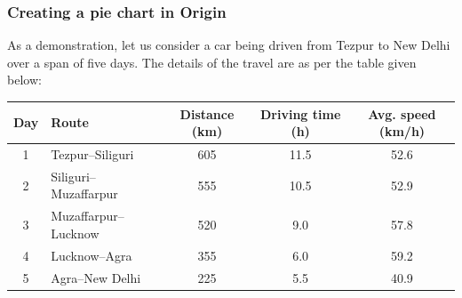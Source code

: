 		\subsubsection{Creating a pie chart in Origin}
			As a demonstration, let us consider a car being driven from Tezpur to New Delhi over a span of five days. The details of the travel are as per the table given below:\vspace{-1.5ex}
			\begin{table}[h!]
				\centering
				\begin{tabular}{c l S[table-format=4.0] S[table-format=2.1] S[table-format=2.1]} %
					\toprule[1.5pt]
					\textbf{Day} & \textbf{Route} & \textbf{Distance (km)} & \textbf{Driving time (h)} & \textbf{Avg. speed (km/h)} \\ %
					 & Tezpur--Siliguri       & 605 & 11.5 & 52.6 \\ %
					2 & Siliguri--Muzaffarpur  & 555 & 10.5 & 52.9 \\ %
					3 & Muzaffarpur--Lucknow   & 520 &  9.0 & 57.8 \\ %
					4 & Lucknow--Agra          & 355 &  6.0 & 59.2 \\ %
					5 & Agra--New Delhi        & 225 &  5.5 & 40.9 \\ %
					\bottomrule[1.5pt]
				\end{tabular}
			\end{table}
			
